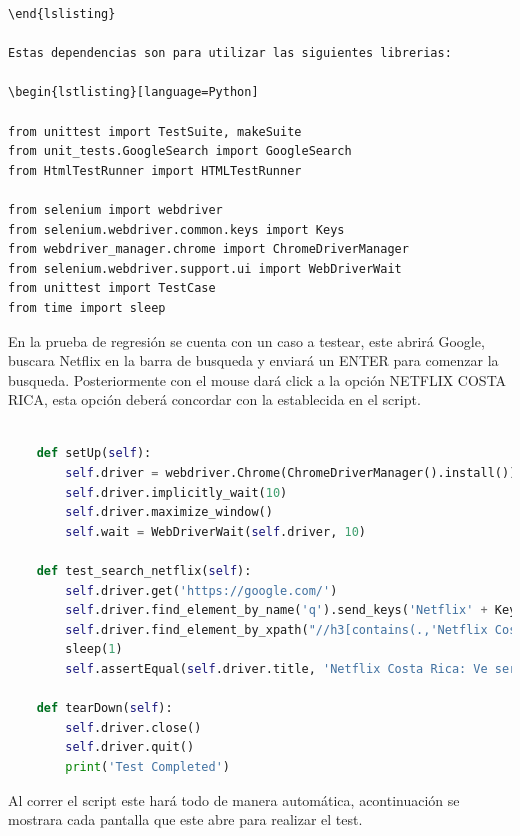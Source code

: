\documentclass[conference]{IEEEtran}
\begin{document}
\begin{lstlisting}[style=CMD]
\end{lslisting}

Estas dependencias son para utilizar las siguientes librerias:

\begin{lstlisting}[language=Python]

from unittest import TestSuite, makeSuite
from unit_tests.GoogleSearch import GoogleSearch
from HtmlTestRunner import HTMLTestRunner

from selenium import webdriver
from selenium.webdriver.common.keys import Keys
from webdriver_manager.chrome import ChromeDriverManager
from selenium.webdriver.support.ui import WebDriverWait
from unittest import TestCase
from time import sleep

\end{lstlisting}

En la prueba de regresión se cuenta con un caso a testear, este abrirá Google, buscara Netflix en la barra de busqueda y enviará un ENTER para comenzar la busqueda. Posteriormente con el mouse dará click a la opción NETFLIX COSTA RICA, esta opción deberá concordar con la establecida en el script.

\begin{lstlisting}[language=Python, breaklines=true,
    postbreak=\mbox{\textcolor{red}{$\hookrightarrow$}\space}]

    def setUp(self):
        self.driver = webdriver.Chrome(ChromeDriverManager().install())
        self.driver.implicitly_wait(10)
        self.driver.maximize_window()
        self.wait = WebDriverWait(self.driver, 10)

    def test_search_netflix(self):
        self.driver.get('https://google.com/')
        self.driver.find_element_by_name('q').send_keys('Netflix' + Keys.RETURN)
        self.driver.find_element_by_xpath("//h3[contains(.,'Netflix Costa Rica')]").click()
        sleep(1)
        self.assertEqual(self.driver.title, 'Netflix Costa Rica: Ve series online, ve peliculas online')

    def tearDown(self):
        self.driver.close()
        self.driver.quit()
        print('Test Completed')

\end{lstlisting}

Al correr el script este hará todo de manera automática, acontinuación se mostrara cada pantalla que este abre para realizar el test.
\end{document}
